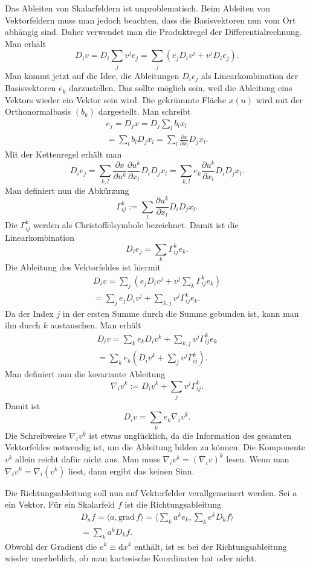 \documentclass[a4paper,10pt,fleqn,twocolumn,twoside]{article}
\begin{document}
Das Ableiten von Skalarfeldern ist unproblematisch. Beim Ableiten von
Vektorfeldern muss man jedoch beachten, dass die Basisvektoren nun
vom Ort abhängig sind. Daher verwendet man die Produktregel der
Differentialrechnung. Man erhält
\[D_i v = D_i\sum_{j}v^je_j
= \sum_{j}(e_jD_i v^j+v^jD_i e_j).\]
Man kommt jetzt auf die Idee, die Ableitungen \(D_ie_j\) als
Linearkombination der Basisvektoren \(e_k\) darzustellen. Das sollte
möglich sein, weil die Ableitung eins Vektors wieder ein Vektor sein
wird. Die gekrümmte Fläche \(x(u)\) wird mit der Orthonormalbasis
\((b_k)\) dargestellt. Man schreibt
\begin{gather*}
e_j = D_jx = D_j\sum_{l} b_lx_l\\
= \sum_{l}b_l D_jx_l
= \sum_{l}\frac{\partial x}{\partial x_l}D_jx_l.
\end{gather*}
Mit der Kettenregel erhält man
\[D_ie_j = \sum_{k,l}\frac{\partial x}{\partial u^k}
\frac{\partial u^k}{\partial x_l}D_iD_jx_l
= \sum_{k,l}e_k\frac{\partial u^k}{\partial x_l}D_iD_jx_l.\]
Man definiert nun die Abkürzung
\[\Gamma_{ij}^k := \sum_{l}\frac{\partial u^k}
{\partial x_l}D_iD_jx_l.\]
Die \(\Gamma_{ij}^k\) werden als Christoffelsymbole bezeichnet.
Damit ist die Linearkombination
\[D_ie_j = \sum_{k} \Gamma_{ij}^k e_k.\]
Die Ableitung des Vektorfeldes ist hiermit
\begin{gather*}
D_i v  = \sum_{j}(e_jD_i v^j+v^j\sum_{k} \Gamma_{ij}^k e_k)\\
= \sum_{j}e_jD_i v^j+\sum_{k,j}v^j \Gamma_{ij}^k e_k.
\end{gather*}
Da der Index \(j\) in der ersten Summe durch die Summe gebunden ist,
kann man ihn durch \(k\) austauschen. Man erhält
\begin{gather*}
D_i v = \sum_{k}e_kD_i v^k+\sum_{k,j}v^j \Gamma_{ij}^k e_k\\
= \sum_{k}e_k(D_i v^k+\sum_{j}v^j\Gamma_{ij}^k).
\end{gather*}
Man definiert nun die kovariante Ableitung
\[\nabla_i v^k := D_i v^k+\sum_{j}v^j\Gamma_{ij}^k.\]
Damit ist
\[D_i v = \sum_{k}e_k\nabla_i v^k.\]
Die Schreibweise \(\nabla_i v^k\) ist etwas unglücklich, da die
Information des gesamten Vektorfeldes notwendig ist, um die Ableitung
bilden zu können. Die Komponente \(v^k\) allein reicht dafür nicht
aus. Man muss \(\nabla_i v^k=(\nabla_i v)^k\) lesen. Wenn man
\(\nabla_i v^k=\nabla_i(v^k)\) liest, dann ergibt das keinen Sinn.

Die Richtungsableitung soll nun auf Vektorfelder verallgemeinert
werden. Sei \(a\) ein Vektor. Für ein Skalarfeld \(f\) ist die
Richtungsableitung
\begin{gather*}
{D_a}f = \langle a,\mathrm{grad}\,f\rangle
= \langle \sum_k a^ke_k,\sum_k e^k D_k f\rangle\\
= \sum_k a^k D_k f.
\end{gather*}
Obwohl der Gradient die \(e^k\equiv\mathrm dx^k\) enthält, ist es bei
der Richtungsableitung wieder unerheblich, ob man kartesische
Koordinaten hat oder nicht.
\end{document}
